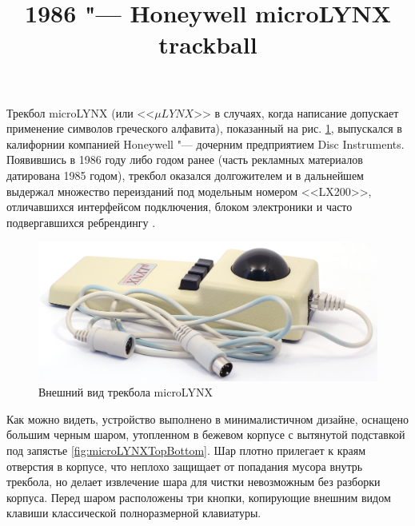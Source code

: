 \documentclass[11pt, a4paper]{article}
\begin{document}
\title{1986 "--- Honeywell microLYNX trackball}
\date{}
\maketitle

Трекбол microLYNX (или <<$\mu LYNX$>> в случаях, когда написание допускает применение символов греческого алфавита), показанный на рис. \ref{fig:microLYNXPic}, выпускался в калифорнии компанией Honeywell "--- дочерним предприятием Disc Instruments. Появившись в 1986 году либо годом ранее (часть рекламных материалов датирована 1985 годом), трекбол оказался долгожителем и в дальнейшем выдержал множество переизданий под модельным номером <<LX200>>, отличавшихся интерфейсом подключения, блоком электроники и часто подвергавшихся ребрендингу \cite{lx200}.


\begin{figure}[h]
    \centering
    \includegraphics[scale=0.45]{1986_honeywell_microlynx_trackball/pic_30.jpg}
    \caption{Внешний вид трекбола microLYNX}
    \label{fig:microLYNXPic}
\end{figure}

Как можно видеть, устройство выполнено в минималистичном дизайне, оснащено большим черным шаром, утопленном в бежевом корпусе с вытянутой подставкой под запястье \ref{fig:microLYNXTopBottom}. Шар плотно прилегает к краям отверстия в корпусе, что неплохо защищает от попадания мусора внутрь трекбола, но делает извлечение шара для чистки невозможным без разборки корпуса. Перед шаром расположены три кнопки, копирующие внешним видом клавиши классической полноразмерной клавиатуры.
\end{document}

